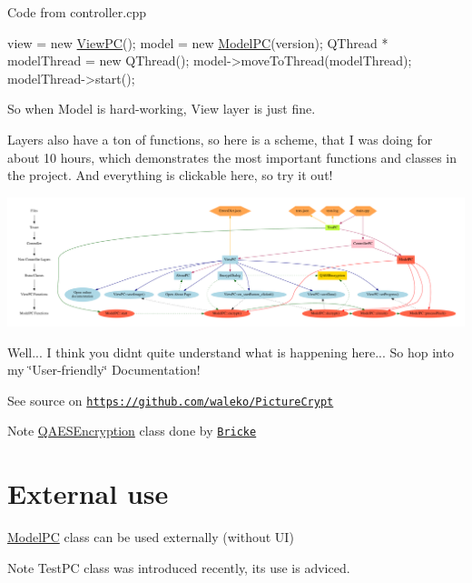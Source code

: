 Code from controller.\+cpp 
\begin{DoxyCode}
view = \textcolor{keyword}{new} \hyperlink{class_view_p_c}{ViewPC}();
model = \textcolor{keyword}{new} \hyperlink{class_model_p_c}{ModelPC}(version);
QThread * modelThread = \textcolor{keyword}{new} QThread();
model->moveToThread(modelThread);
modelThread->start();
\end{DoxyCode}
 So when Model is hard-\/working, View layer is just fine.

Layers also have a ton of functions, so here is a scheme, that I was doing for about 10 hours, which demonstrates the most important functions and classes in the project. And everything is clickable here, so try it out! 
\begin{DoxyImageNoCaption}
  \mbox{\includegraphics[width=\textwidth,height=\textheight/2,keepaspectratio=true]{dot_mainpage}}
\end{DoxyImageNoCaption}
 Well... I think you didn\textquotesingle{}t quite understand what is happening here... So hop into my \char`\"{}\+User-\/friendly\char`\"{} Documentation!

See source on \href{https://github.com/waleko/PictureCrypt}{\tt https\+://github.\+com/waleko/\+Picture\+Crypt}

\begin{DoxyNote}{Note}
\hyperlink{class_q_a_e_s_encryption}{Q\+A\+E\+S\+Encryption} class done by \href{https://github.com/bricke}{\tt Bricke}
\end{DoxyNote}
\hypertarget{index_ext-use}{}\section{External use}\label{index_ext-use}
\hyperlink{class_model_p_c}{Model\+PC} class can be used externally (without UI) \begin{DoxyNote}{Note}
Test\+PC class was introduced recently, its use is adviced.
\end{DoxyNote}

